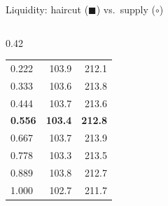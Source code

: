 \documentclass[aspectratio=169,10pt]{beamer}
\begin{document}
\begin{frame}{Liquidity: haircut ($\blacksquare$) vs.\ supply ($\circ$)}
\begin{columns}[T]
\begin{column}{0.42\textwidth}
\begin{tabular}{lrr}
        0.222 & 103.9 & 212.1 \\
        0.333 & 103.6 & 213.8 \\
        0.444 & 103.7 & 213.6 \\
        \textbf{0.556} & \textbf{103.4} & \textbf{212.8} \\
        0.667 & 103.7 & 213.9 \\
        0.778 & 103.3 & 213.5 \\
        0.889 & 103.8 & 212.7 \\
        1.000 & 102.7 & 211.7 \\
        \bottomrule
      \end{tabular}
    \end{column}
  \end{columns}
\end{frame}
\end{document}
